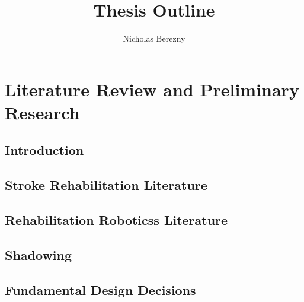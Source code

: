 \documentclass{article}
\author{Nicholas Berezny}
\title{Thesis Outline}
\begin{document}
\maketitle
\newpage

\section{Literature Review and Preliminary Research}

	\subsection{Introduction}

	\subsection{Stroke Rehabilitation Literature}
%
	
	
	\subsection{Rehabilitation Roboticss Literature}
%
%
	\subsection{Shadowing}
%
	
	
	
	
	
	\subsection{Fundamental Design Decisions}
%
\end{document}
